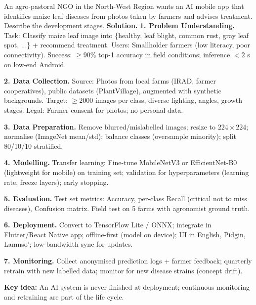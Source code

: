 \documentclass[11pt]{article}
\begin{document}
\begin{exoresolu}
An agro-pastoral NGO in the North-West Region wants an AI mobile app that identifies maize leaf diseases from photos taken by farmers and advises treatment. Describe the development stages.
\tcblower
\textbf{Solution.}
\textbf{1. Problem Understanding.} Task: Classify maize leaf image into \{healthy, leaf blight, common rust, gray leaf spot, ...\} + recommend treatment. Users: Smallholder farmers (low literacy, poor connectivity). Success: $\ge 90\%$ top-1 accuracy in field conditions; inference $< 2$ s on low-end Android.

\textbf{2. Data Collection.} Source: Photos from local farms (IRAD, farmer cooperatives), public datasets (PlantVillage), augmented with synthetic backgrounds. Target: $\ge 2000$ images per class, diverse lighting, angles, growth stages. Legal: Farmer consent for photos; no personal data.

\textbf{3. Data Preparation.} Remove blurred/mislabelled images; resize to $224\times224$; normalise (ImageNet mean/std); balance classes (oversample minority); split 80/10/10 stratified.

\textbf{4. Modelling.} Transfer learning: Fine-tune MobileNetV3 or EfficientNet-B0 (lightweight for mobile) on training set; validation for hyperparameters (learning rate, freeze layers); early stopping.

\textbf{5. Evaluation.} Test set metrics: Accuracy, per-class Recall (critical not to miss diseases), Confusion matrix. Field test on 5 farms with agronomist ground truth.

\textbf{6. Deployment.} Convert to TensorFlow Lite / ONNX; integrate in Flutter/React Native app; offline-first (model on device); UI in English, Pidgin, Lamnso'; low-bandwidth sync for updates.

\textbf{7. Monitoring.} Collect anonymised prediction logs + farmer feedback; quarterly retrain with new labelled data; monitor for new disease strains (concept drift).

\textbf{Key idea:} An AI system is never finished at deployment; continuous monitoring and retraining are part of the life cycle.
\end{exoresolu}
\end{document}
